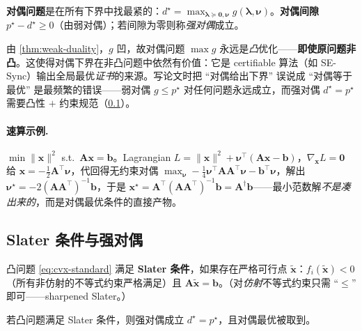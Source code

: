 \textbf{对偶问题}是在所有下界中找最紧的：$d^\star=\max_{\boldsymbol\lambda\succeq\mathbf 0,\boldsymbol\nu}g(\boldsymbol\lambda,\boldsymbol\nu)$。\textbf{对偶间隙} $p^\star-d^\star\ge0$（由弱对偶）；若间隙为零则称\emph{强对偶}成立。

\begin{insight}\label{ins:dual-always-convex}
由 \cref{thm:weak-duality}，$g$ 凹，故对偶问题 $\max g$ 永远是\emph{凸}优化——\textbf{即使原问题非凸}。这使得对偶下界在非凸问题中依然有价值：它是 certifiable 算法（如 SE-Sync）输出全局最优\emph{证书}的来源。写论文时把 “对偶给出下界” 误说成 “对偶等于最优” 是最频繁的错误——弱对偶 $g\le p^\star$ 对任何问题永远成立，而强对偶 $d^\star=p^\star$ 需要凸性 $+$ 约束规范（\cref{subsec:cvx-slater}）。
\end{insight}

\paragraph{速算示例.}\;$\min\|\mathbf x\|^2$ s.t.\ $\mathbf A\mathbf x=\mathbf b$。Lagrangian $L=\|\mathbf x\|^2+\boldsymbol\nu^\top(\mathbf A\mathbf x-\mathbf b)$，$\nabla_{\mathbf x}L=\mathbf 0$ 给 $\mathbf x=-\tfrac12\mathbf A^\top\boldsymbol\nu$，代回得无约束对偶 $\max_{\boldsymbol\nu}-\tfrac14\boldsymbol\nu^\top\mathbf A\mathbf A^\top\boldsymbol\nu-\mathbf b^\top\boldsymbol\nu$，解出 $\boldsymbol\nu^\star=-2(\mathbf A\mathbf A^\top)^{-1}\mathbf b$，于是 $\mathbf x^\star=\mathbf A^\top(\mathbf A\mathbf A^\top)^{-1}\mathbf b=\mathbf A^\dagger\mathbf b$——最小范数解\emph{不是凑出来的}，而是对偶最优条件的直接产物。

\subsection{Slater 条件与强对偶}
\label{subsec:cvx-slater}

\begin{definition}[Slater 条件]\label{def:slater}
凸问题 \cref{eq:cvx-standard} 满足 \textbf{Slater 条件}，如果存在严格可行点 $\tilde{\mathbf x}$：$f_i(\tilde{\mathbf x})<0$（所有非仿射的不等式约束严格满足）且 $\mathbf A\tilde{\mathbf x}=\mathbf b$。（对\emph{仿射}不等式约束只需 “$\le$” 即可——sharpened Slater。）
\end{definition}

\begin{theorem}\label{thm:strong-duality}
若凸问题满足 Slater 条件，则强对偶成立 $d^\star=p^\star$，且对偶最优被取到。
\end{theorem}

